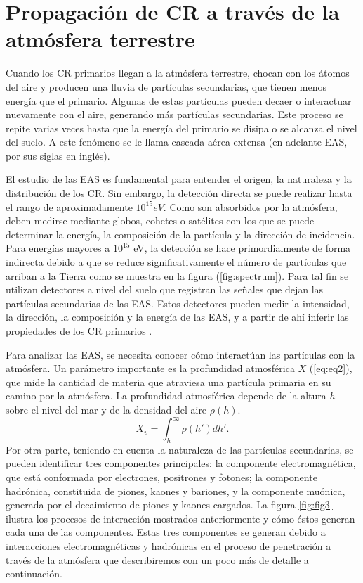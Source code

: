\section{Propagación de CR a través de la atmósfera terrestre}

Cuando los CR primarios llegan a la atmósfera terrestre, chocan con los átomos del aire y producen una lluvia de partículas secundarias, que tienen menos energía que el primario. Algunas de estas partículas pueden decaer o interactuar nuevamente con el aire, generando más partículas secundarias. Este proceso se repite varias veces hasta que la energía del primario se disipa o se alcanza el nivel del suelo. A este fenómeno se le llama cascada aérea extensa (en adelante EAS, por sus siglas en inglés).

El estudio de las EAS es fundamental para entender el origen, la naturaleza y la distribución de los CR. Sin embargo, la detección directa se puede realizar hasta el rango de aproximadamente $10^{15}eV$. Como son absorbidos por la atmósfera, deben medirse mediante globos, cohetes o satélites con los que se puede determinar la energía, la composición de la partícula y la dirección de incidencia. Para energías mayores a $10^{15}$ eV, la detección se hace primordialmente de forma indirecta debido a que se reduce significativamente el número de partículas que arriban a la Tierra como se muestra en la figura (\ref{fig:spectrum}). Para tal fin se utilizan detectores a nivel del suelo que registran las señales que dejan las partículas secundarias de las EAS. Estos detectores pueden medir la intensidad, la dirección, la composición y la energía de las EAS, y a partir de ahí inferir las propiedades de los CR primarios \cite{kampert_2012}. 

Para analizar las EAS, se necesita conocer cómo interactúan las partículas con la atmósfera. Un parámetro importante es la profundidad atmosférica $X$ (\ref{eq:eq2}), que mide la cantidad de materia que atraviesa una partícula primaria en su camino por la atmósfera. La profundidad atmosférica depende de la altura $h$ sobre el nivel del mar y de la densidad del aire $\rho(h)$.  
\begin{equation}
X_{v}= \int_{h}^{\infty} \rho (h') dh'.
\label{eq:eq2}
\end{equation}
Por otra parte, teniendo en cuenta la naturaleza de las partículas secundarias, se pueden identificar tres componentes principales: la componente electromagnética, que está conformada por electrones, positrones y fotones; la componente hadrónica, constituida de piones, kaones y bariones, y la componente muónica, generada por el decaimiento de piones y kaones cargados. La figura \ref{fig:fig3} ilustra los procesos de interacción mostrados anteriormente y cómo éstos generan cada una de las componentes. Estas tres componentes se generan debido a interacciones electromagnéticas y hadrónicas en el proceso de penetración a través de la atmósfera que describiremos con un poco más de detalle a continuación.

